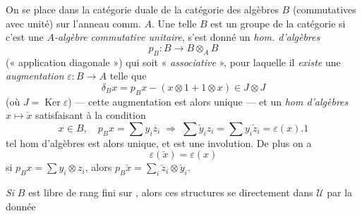 \documentclass[11pt,a4paper]{article}
\begin{document}


On se place dans la catégorie duale de la catégorie des algèbres $B$
(commutatives avec unité) sur l'anneau comm. $A$. Une telle $B$ est un
groupe de la catégorie si c'est une \emph{$A$-algèbre commutative unitaire},
s'est donné un \emph{hom. d'algèbres}
\[
p_B : B \longrightarrow B \otimes_A B
\]
(« application diagonale ») qui soit « \emph{associative} », pour laquelle il
\emph{existe} une \emph{augmentation} $\varepsilon : B \to A$
\struck{\ill{}} telle que
\[
\delta_B x = p_B x - (x \otimes 1 + 1 \otimes x) \in J \otimes J
\]
(où $J = \operatorname{Ker} \varepsilon$) --- cette augmentation est
alors unique --- et un \emph{hom d'algèbres} $x \mapsto \check{x}$
satisfaisant à la condition
\[
x \in B, \quad p_B x = \sum y_i z_i \;\Longrightarrow\;
\sum \check{y}_i z_i = \sum y_i \check{z}_i = \varepsilon(x) . 1
\]
 tel hom d'algèbres est alors unique, et est une involution.
De plus on a
\[
\varepsilon(\check{x}) = \varepsilon(x)
\]
si $p_B x = \sum y_i \otimes z_i$, alors
$p_B \check{x} = \sum_i \check{z}_i \otimes \check{y}_i$.

\emph{Si} $B$ est libre de rang fini sur , alors ces structures se  directement dans
$\mathcal{U}$ par la donnée             \struck{\ill{}}   \struck{\ill{}} 

\end{document}

